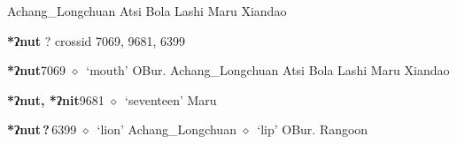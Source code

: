 \begin{list}{}{\leftmargin=1.5em \itemindent=-1.5em}
\hspace{1ex}
         Achang\_Longchuan 
\hspace{1ex}
         Atsi 
\hspace{1ex}
         Bola 
\hspace{1ex}
         Lashi 
\hspace{1ex}
         Maru 
\hspace{1ex}
         Xiandao 
  \end{list}
\item
\textbf{*ʔnut}
?
  {\tiny crossid 7069, 9681, 6399}
  \begin{list}{}{\leftmargin=1.5em \itemindent=-1.5em}
  \item {\footnotesize \textbf{*ʔnut}}{\tiny 7069}
         $\diamond$~`mouth'
         OBur. 
\hspace{1ex}
         Achang\_Longchuan 
\hspace{1ex}
         Atsi 
\hspace{1ex}
         Bola 
\hspace{1ex}
         Lashi 
\hspace{1ex}
         Maru 
\hspace{1ex}
         Xiandao 
  \item {\footnotesize \textbf{*ʔnut, *ʔnit}}{\tiny 9681}
\hspace{1ex}
         $\diamond$~`seventeen'
         Maru 
  \item {\footnotesize \textbf{*ʔnut\,?\,}}{\tiny 6399}
\hspace{1ex}
         $\diamond$~`lion'
         Achang\_Longchuan 
\hspace{1ex}
         $\diamond$~`lip'
         OBur. 
\hspace{1ex}
         Rangoon 
\hspace{1ex}

\end{list}
